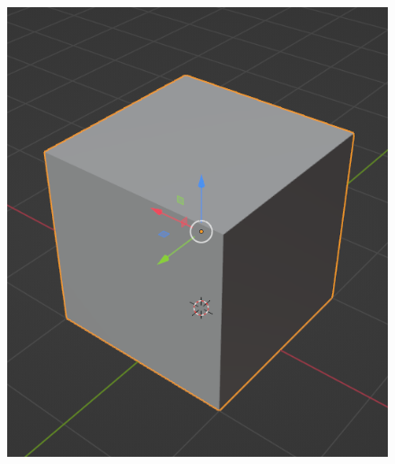 \documentclass{ltjsreport}
\begin{document}
			\begin{figure}[H]
			\centering
			\begin{minipage}{0.25\columnwidth}
			\centering
			\includegraphics[width = \columnwidth]{../figs/SmoothingBeforCube.png}
			\end{minipage}
			\hspace{0.04\columnwidth}
			\begin{minipage}{0.25\columnwidth}
			\centering

\end{minipage}
\end{figure}
\end{document}
